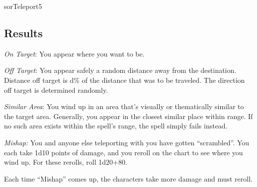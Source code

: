 \begin{spellcard}{sor}{Teleport}{5}
  \subsection*{Results}
  \emph{On Target}: You appear where you want to be.

  \emph{Off Target}: You appear safely a random distance away from the destination.
  Distance off target is d\% of the distance that was to be traveled.
  The direction off target is determined randomly.

  \emph{Similar Area}: You wind up in an area that's visually or thematically similar to the target area.
  Generally, you appear in the closest similar place within range.
  If no such area exists within the spell's range, the spell simply fails instead.

  \emph{Mishap:} You and anyone else teleporting with you have gotten ``scrambled''.
  You each take 1d10 points of damage, and you reroll on the chart to see where you wind up.
  For these rerolls, roll 1d20+80.

  Each time ``Mishap'' comes up, the characters take more damage and must reroll.

\end{spellcard}

